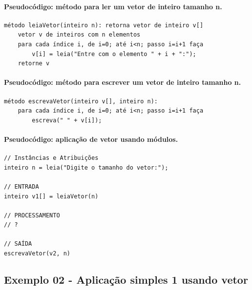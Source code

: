 \documentclass[12pt,a4paper]{article}
\begin{document}
    \hypertarget{pseudocuxf3digo-muxe9todo-para-ler-um-vetor-de-inteiro-tamanho-n.}{%
\paragraph{Pseudocódigo: método para ler um vetor de inteiro tamanho
n.}\label{pseudocuxf3digo-muxe9todo-para-ler-um-vetor-de-inteiro-tamanho-n.}}

    \begin{verbatim}
método leiaVetor(inteiro n): retorna vetor de inteiro v[]
    vetor v de inteiros com n elementos
    para cada índice i, de i=0; até i<n; passo i=i+1 faça
        v[i] = leia("Entre com o elemento " + i + ":");
    retorne v
\end{verbatim}

    \hypertarget{pseudocuxf3digo-muxe9todo-para-escrever-um-vetor-de-inteiro-tamanho-n.}{%
\paragraph{Pseudocódigo: método para escrever um vetor de inteiro
tamanho
n.}\label{pseudocuxf3digo-muxe9todo-para-escrever-um-vetor-de-inteiro-tamanho-n.}}

    \begin{verbatim}
método escrevaVetor(inteiro v[], inteiro n):
    para cada índice i, de i=0; até i<n; passo i=i+1 faça
        escreva(" " + v[i]);
\end{verbatim}

    \hypertarget{pseudocuxf3digo-aplicauxe7uxe3o-de-vetor-usando-muxf3dulos.}{%
\paragraph{Pseudocódigo: aplicação de vetor usando
módulos.}\label{pseudocuxf3digo-aplicauxe7uxe3o-de-vetor-usando-muxf3dulos.}}

    \begin{verbatim}
// Instâncias e Atribuições
inteiro n = leia("Digite o tamanho do vetor:");

// ENTRADA
inteiro v1[] = leiaVetor(n)

// PROCESSAMENTO
// ?

// SAÍDA
escrevaVetor(v2, n)
\end{verbatim}

    \hypertarget{exemplo-02---aplicauxe7uxe3o-simples-1-usando-vetor}{%
\subsection{Exemplo 02 - Aplicação simples 1 usando
vetor}\label{exemplo-02---aplicauxe7uxe3o-simples-1-usando-vetor}}
\end{document}

